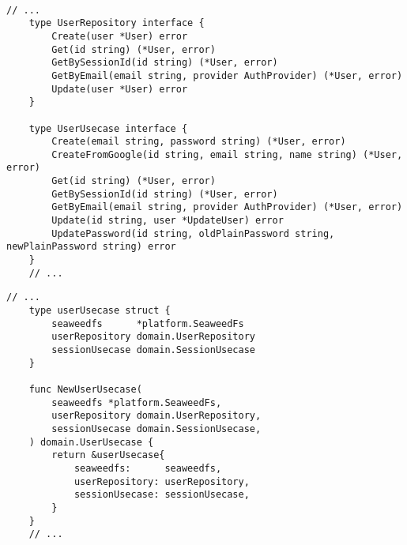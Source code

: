  \\

    \begin{lstlisting}[label={lst:appendix-user-domain}, caption={ชุดคำสั่งที่นิยาม Interface ของ User Repository และ User Usecase}]
    // ...
    type UserRepository interface {
        Create(user *User) error
        Get(id string) (*User, error)
        GetBySessionId(id string) (*User, error)
        GetByEmail(email string, provider AuthProvider) (*User, error)
        Update(user *User) error
    }
    
    type UserUsecase interface {
        Create(email string, password string) (*User, error)
        CreateFromGoogle(id string, email string, name string) (*User, error)
        Get(id string) (*User, error)
        GetBySessionId(id string) (*User, error)
        GetByEmail(email string, provider AuthProvider) (*User, error)
        Update(id string, user *UpdateUser) error
        UpdatePassword(id string, oldPlainPassword string, newPlainPassword string) error
    }
    // ...
    \end{lstlisting}
    
    \begin{lstlisting}[label={lst:appendix-user-usecase}, caption={ชุดคำสั่งสร้างและนิยาม UserUsecase ที่มีการ Implement UserRepository}]
    // ...
    type userUsecase struct {
        seaweedfs      *platform.SeaweedFs
        userRepository domain.UserRepository
        sessionUsecase domain.SessionUsecase
    }
    
    func NewUserUsecase(
        seaweedfs *platform.SeaweedFs,
        userRepository domain.UserRepository,
        sessionUsecase domain.SessionUsecase,
    ) domain.UserUsecase {
        return &userUsecase{
            seaweedfs:      seaweedfs,
            userRepository: userRepository,
            sessionUsecase: sessionUsecase,
        }
    }
    // ...
    \end{lstlisting}
    
\pagebreak